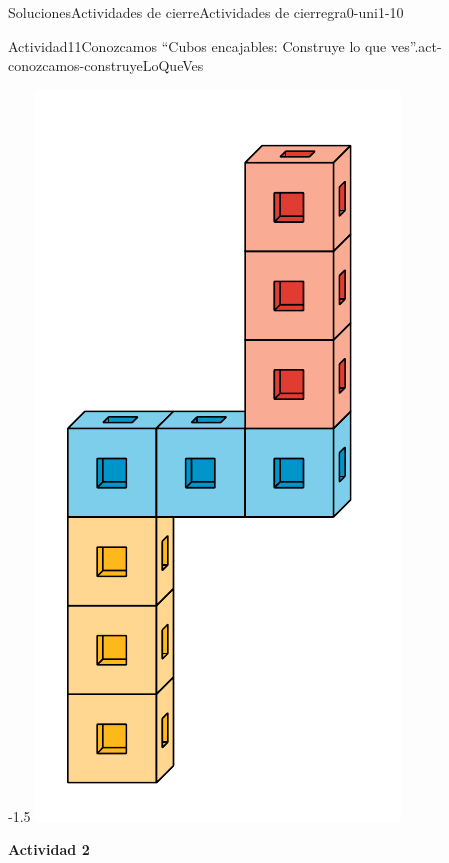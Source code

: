 \documentclass[twoside,10pt,]{article}
\begin{document}
\begin{solutions-section}{Soluciones}{Actividades de cierre}{}{Actividades de cierre}{}{}{gra0-uni1-10}
\begin{activitysolution}{Actividad}{11}{Conozcamos “Cubos encajables: Construye lo que ves”.}{act-conozcamos-construyeLoQueVes}
\begin{image}{0}{1}{0}{-1.5\baselineskip}
\includegraphics[width=\linewidth]{external/svg-source/tikz-file-148146.pdf}
\end{image}%
\end{activitysolution}%
\par\medskip
\noindent\textbf{\large{}\space\textperiodcentered\space{}Actividad 2}

\end{solutions-section}
\end{document}
